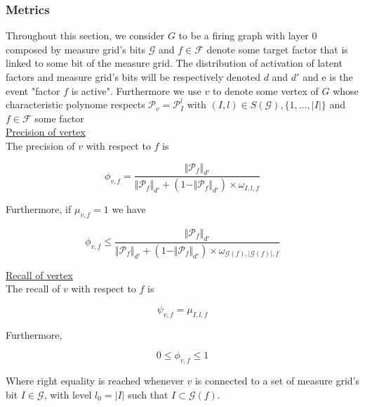 \documentclass[a4paper, 11pt]{article}
\begin{document}
\subsubsection*{Metrics}

Throughout this section, we consider $G$ to be a firing graph with layer 0 composed by measure grid's bits $\mathcal{G}$ and $f \in \mathcal{F}$ denote some target factor that is linked to some bit of the measure grid. The distribution of activation of latent factors and measure grid's bits will be respectively denoted $d$ and $d'$ and e is the event "factor $f$ is active". Furthermore we use $v$ to denote some vertex of $G$ whose characteristic polynome respects $\mathcal{P}_v = \mathcal{P}_{I}^{l}$ with $(I, l) \in S(\mathcal{G}), \{1, \ldots, \vert I \vert\}$ and $f \in \mathcal{F}$ some factor\\

\underline{Precision of vertex}\\

The precision of $v$ with respect to $f$ is

\begin{equation}
\label{prop:precision1}
\phi_{v, f} = \frac{\Vert \mathcal{P}_{f} \Vert_{d'}}{\Vert \mathcal{P}_{f} \Vert_{d'} + (1 - \Vert \mathcal{P}_{f} \Vert_{d'}) \times \omega_{I, l, f}}
\end{equation}

Furthermore, if $\mu_{v, f} = 1$ we have

\begin{equation}
\label{prop:precision2}
\phi_{v, f} \leq \frac{\Vert \mathcal{P}_{f} \Vert_{d'}}{\Vert \mathcal{P}_{f} \Vert_{d'} + (1 - \Vert \mathcal{P}_{f} \Vert_{d'}) \times \omega_{\mathcal{G}(f),\vert \mathcal{G}(f) \vert, f}} 
\end{equation}

\underline{Recall of vertex}\\

The recall of $v$ with respect to $f$ is

\begin{equation}
\label{prop:recall1}
\psi_{v, f} = \mu_{I, l, f}
\end{equation}

Furthermore, 

\begin{equation}
\label{prop:recall2}
0 \leq \phi_{v, f} \leq 1
\end{equation}

Where right equality is reached whenever $v$ is connected to a set of measure grid's bit $I \in \mathcal{G}$, with level $l_0 = \vert I \vert$ such that $I \subset \mathcal{G}(f)$. \\
\end{document}
